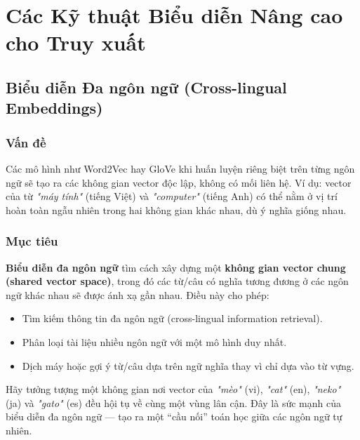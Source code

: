 

\section{Các Kỹ thuật Biểu diễn Nâng cao cho Truy xuất}
\label{sec:advanced_representation_retrieval}

\subsection{Biểu diễn Đa ngôn ngữ (Cross-lingual Embeddings)}
\label{ssec:cross_lingual_embeddings}

\subsubsection*{Vấn đề}
Các mô hình như Word2Vec hay GloVe khi huấn luyện riêng biệt trên từng ngôn ngữ sẽ tạo ra các không gian vector độc lập, không có mối liên hệ.  
Ví dụ: vector của từ \textit{"máy tính"} (tiếng Việt) và \textit{"computer"} (tiếng Anh) có thể nằm ở vị trí hoàn toàn ngẫu nhiên trong hai không gian khác nhau, dù ý nghĩa giống nhau.

\subsubsection*{Mục tiêu}
\textbf{Biểu diễn đa ngôn ngữ} tìm cách xây dựng một \textbf{không gian vector chung (shared vector space)}, trong đó các từ/câu có nghĩa tương đương ở các ngôn ngữ khác nhau sẽ được ánh xạ gần nhau. Điều này cho phép:
\begin{itemize}
    \item Tìm kiếm thông tin đa ngôn ngữ (cross-lingual information retrieval).
    \item Phân loại tài liệu nhiều ngôn ngữ với một mô hình duy nhất.
    \item Dịch máy hoặc gợi ý từ/câu dựa trên ngữ nghĩa thay vì chỉ dựa vào từ vựng.
\end{itemize}

\begin{tcolorbox}[
    title={Một "Ngôn ngữ chung" của các Vector},
    colback=green!5!white, colframe=green!50!black, fonttitle=\bfseries
]
Hãy tưởng tượng một không gian nơi vector của \textit{"mèo"} (vi), \textit{"cat"} (en), \textit{"neko"} (ja) và \textit{"gato"} (es) đều hội tụ về cùng một vùng lân cận. Đây là sức mạnh của biểu diễn đa ngôn ngữ — tạo ra một “cầu nối” toán học giữa các ngôn ngữ tự nhiên.
\end{tcolorbox}

